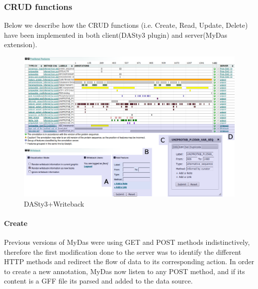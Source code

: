 

\subsubsection{CRUD functions}
Below we describe how the CRUD functions (i.e. Create, Read, Update, Delete) have been implemented in both client(DASty3 plugin) and server(MyDas extension).

\begin{figure}[ht]
\centering
\includegraphics[width=6.5in]{figures/dasty3wbT.png} 
\caption{DASty3+Writeback}  \label{fig: dasty+wb}
\end{figure}

\paragraph{Create}
Previous versions of MyDas were using GET and POST methods indistinctively, therefore the first modification done to the server was to identify the different HTTP methods and redirect the flow of data to its corresponding action. In order to create a new annotation, MyDas now listen to any POST method, and if its content is a GFF file its parsed and added to the data source. 

